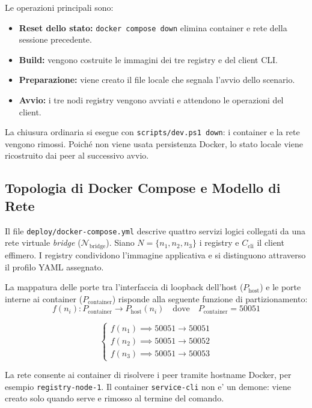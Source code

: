 \documentclass[conference]{IEEEtran}
\begin{document}
Le operazioni principali sono:
\begin{itemize}
    \item \textbf{Reset dello stato:} \texttt{docker compose down} elimina container e rete della sessione precedente.
    \item \textbf{Build:} vengono costruite le immagini dei tre registry e del client CLI.
    \item \textbf{Preparazione:} viene creato il file locale che segnala l'avvio dello scenario.
    \item \textbf{Avvio:} i tre nodi registry vengono avviati e attendono le operazioni del client.
\end{itemize}

La chiusura ordinaria si esegue con \texttt{scripts/dev.ps1 down}: i container e la rete vengono rimossi. Poiché non viene usata persistenza Docker, lo stato locale viene ricostruito dai peer al successivo avvio.

\subsection{Topologia di Docker Compose e Modello di Rete}
Il file \texttt{deploy/docker-compose.yml} descrive quattro servizi logici collegati da una rete virtuale \textit{bridge} ($\mathcal{N}_{\text{bridge}}$). Siano $N = \{n_1,n_2,n_3\}$ i registry e $C_{\text{cli}}$ il client effimero. I registry condividono l'immagine applicativa e si distinguono attraverso il profilo YAML assegnato.

La mappatura delle porte tra l'interfaccia di loopback dell'host ($P_{\text{host}}$) e le porte interne ai container ($P_{\text{container}}$) risponde alla seguente funzione di partizionamento:
\begin{equation}
f(n_i): P_{\text{container}} \to P_{\text{host}}(n_i) \quad \text{dove} \quad P_{\text{container}} = 50051
\end{equation}

\begin{equation}
\begin{cases} 
f(n_1) \implies 50051 \to 50051 \\ 
f(n_2) \implies 50051 \to 50052 \\ 
f(n_3) \implies 50051 \to 50053 
\end{cases}
\end{equation}

La rete consente ai container di risolvere i peer tramite hostname Docker, per esempio \texttt{registry-node-1}. Il container \texttt{service-cli} non e' un demone: viene creato solo quando serve e rimosso al termine del comando.
\end{document}
